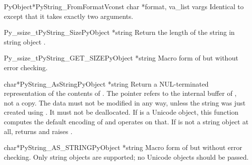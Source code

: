 \begin{cfuncdesc}{PyObject*}{PyString_FromFormatV}{const char *format,
                                                   va_list vargs}
  Identical to  except that it takes
  exactly two arguments.
\end{cfuncdesc}

\begin{cfuncdesc}{Py_ssize_t}{PyString_Size}{PyObject *string}
  Return the length of the string in string object .
\end{cfuncdesc}

\begin{cfuncdesc}{Py_ssize_t}{PyString_GET_SIZE}{PyObject *string}
  Macro form of  but without error
  checking.
\end{cfuncdesc}

\begin{cfuncdesc}{char*}{PyString_AsString}{PyObject *string}
  Return a NUL-terminated representation of the contents of
  .  The pointer refers to the internal buffer of
  , not a copy.  The data must not be modified in any way,
  unless the string was just created using
  .
  It must not be deallocated.  If  is a Unicode object,
  this function computes the default encoding of  and
  operates on that.  If  is not a string object at all,
   returns \NULL{} and raises
  .
\end{cfuncdesc}

\begin{cfuncdesc}{char*}{PyString_AS_STRING}{PyObject *string}
  Macro form of  but without error
  checking.  Only string objects are supported; no Unicode objects
  should be passed.
\end{cfuncdesc}

